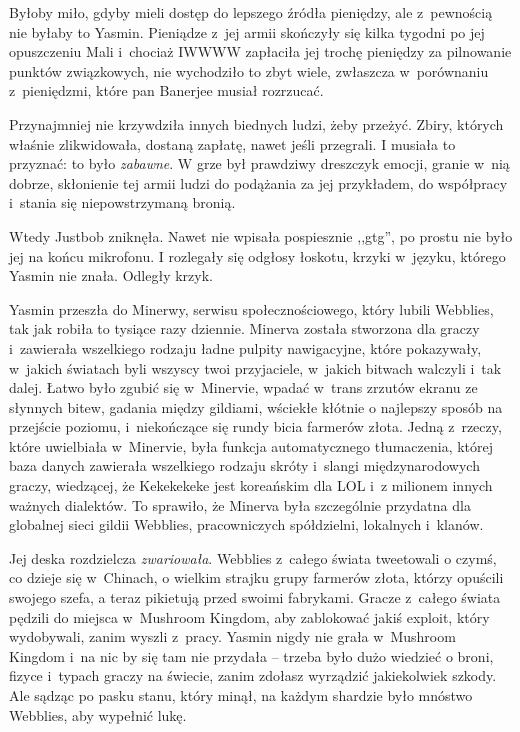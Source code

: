 \documentclass[oneside,polish,11pt,rmheadings]{mwbk}
\begin{document}
Byłoby miło, gdyby mieli dostęp do lepszego źródła pieniędzy, ale z~pewnością nie byłaby to Yasmin. Pieniądze z~jej armii skończyły się kilka tygodni po jej opuszczeniu Mali i~chociaż IWWWW zapłaciła jej trochę pieniędzy za pilnowanie punktów związkowych, nie wychodziło to zbyt wiele, zwłaszcza w~porównaniu z~pieniędzmi, które pan Banerjee musiał rozrzucać.

Przynajmniej nie krzywdziła innych biednych ludzi, żeby przeżyć. Zbiry, których właśnie zlikwidowała, dostaną zapłatę, nawet jeśli przegrali. I musiała to przyznać: to było \textit{zabawne}. W grze był prawdziwy dreszczyk emocji, granie w~nią dobrze, skłonienie tej armii ludzi do podążania za jej przykładem, do współpracy i~stania się niepowstrzymaną bronią.

Wtedy Justbob zniknęła. Nawet nie wpisała pospiesznie ,,gtg'', po prostu nie było jej na końcu mikrofonu. I rozlegały się odgłosy łoskotu, krzyki w~języku, którego Yasmin nie znała. Odległy krzyk.

Yasmin przeszła do Minerwy, serwisu społecznościowego, który lubili Webblies, tak jak robiła to tysiące razy dziennie. Minerva została stworzona dla graczy i~zawierała wszelkiego rodzaju ładne pulpity nawigacyjne, które pokazywały, w~jakich światach byli wszyscy twoi przyjaciele, w~jakich bitwach walczyli i~tak dalej. Łatwo było zgubić się w~Minervie, wpadać w~trans zrzutów ekranu ze słynnych bitew, gadania między gildiami, wściekłe kłótnie o najlepszy sposób na przejście poziomu, i~niekończące się rundy bicia farmerów złota. Jedną z~rzeczy, które uwielbiała w~Minervie, była funkcja automatycznego tłumaczenia, której baza danych zawierała wszelkiego rodzaju skróty i~slangi międzynarodowych graczy, wiedzącej, że Kekekekeke jest koreańskim dla LOL i~z milionem innych ważnych dialektów. To sprawiło, że Minerva była szczególnie przydatna dla globalnej sieci gildii Webblies, pracowniczych spółdzielni, lokalnych i~klanów.

Jej deska rozdzielcza \textit{zwariowała}. Webblies z~całego świata tweetowali o czymś, co dzieje się w~Chinach, o wielkim strajku grupy farmerów złota, którzy opuścili swojego szefa, a teraz pikietują przed swoimi fabrykami. Gracze z~całego świata pędzili do miejsca w~Mushroom Kingdom, aby zablokować jakiś exploit, który wydobywali, zanim wyszli z~pracy. Yasmin nigdy nie grała w~Mushroom Kingdom i~na nic by się tam nie przydała -- trzeba było dużo wiedzieć o broni, fizyce i~typach graczy na świecie, zanim zdołasz wyrządzić jakiekolwiek szkody. Ale sądząc po pasku stanu, który minął, na każdym shardzie było mnóstwo Webblies, aby wypełnić lukę.
\end{document}
